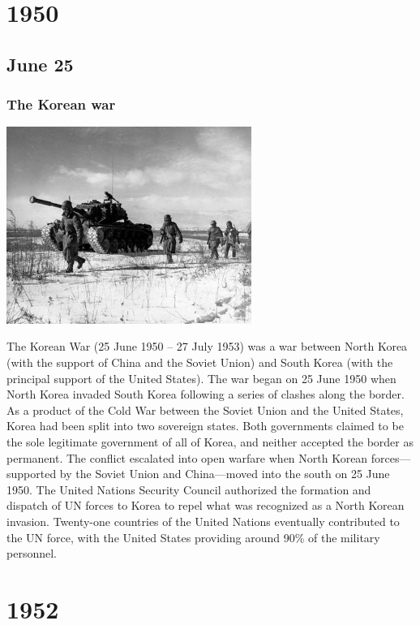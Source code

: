 \documentclass[11pt]{report}
\begin{document}
\chapter{1950}
\section{June 25}
\subsection{The Korean war}
\vspace{2mm}\begin{center}\includegraphics[width=8cm]{./img/koreanWar.jpg}\end{center}
The Korean War (25 June 1950 – 27 July 1953) was a war between North Korea (with the support of China and the Soviet Union) and South Korea (with the principal support of the United States). The war began on 25 June 1950 when North Korea invaded South Korea following a series of clashes along the border.\\
\indent As a product of the Cold War between the Soviet Union and the United States, Korea had been split into two sovereign states. Both governments claimed to be the sole legitimate government of all of Korea, and neither accepted the border as permanent. The conflict escalated into open warfare when North Korean forces—supported by the Soviet Union and China—moved into the south on 25 June 1950. The United Nations Security Council authorized the formation and dispatch of UN forces to Korea to repel what was recognized as a North Korean invasion. Twenty-one countries of the United Nations eventually contributed to the UN force, with the United States providing around 90\% of the military personnel.

\chapter{1952}
\end{document}
